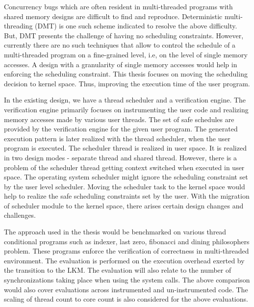 Concurrency bugs which are often resident in multi-threaded programs with shared memory designs are difficult to find and reproduce. 
Deterministic multi-threading (DMT) is one such scheme indicated to resolve the above difficulty. 
But, DMT presents the challenge of having no scheduling constraints.  
However, currently there are no such techniques that allow to control the schedule of a multi-threaded program on a fine-grained level, i.e, on the level of single memory accesses. 
A design with a granularity of single memory accesses would help in enforcing the scheduling constraint. 
This thesis focuses on moving the scheduling decision to kernel space. 
Thus, improving the execution time of the user program.


In the existing design, we have a thread scheduler and a verification engine.  
The verification engine primarily focuses on instrumenting the user code and realizing memory accesses made by various user threads. 
The set of safe schedules are provided by the verification engine for the given user program. 
The generated execution pattern is later realized with the thread scheduler, when the user program is executed. 
The scheduler thread is realized in user space. 
It is realized in two design modes - separate thread and shared thread. 
However, there is a problem of the scheduler thread getting context switched when executed in user space. 
The operating system scheduler might ignore the scheduling constraint set by the user level scheduler. 
Moving the scheduler task to the kernel space would help to realize the safe scheduling constraints set by the user. 
With the migration of scheduler module to the kernel space, there arises certain design changes and challenges. 

The approach used in the thesis would be benchmarked on various thread conditional programs such as indexer, last zero, fibonacci and dining philosophers problem. 
These programs enforce the verification of correctness in multi-threaded environment. 
The evaluation is performed on the execution overhead exerted by the transition to the LKM. 
The evaluation will also relate to the number of synchronizations taking place when using the system calls. 
The above comparison would also cover evaluations across instrumented and un-instrumented code. 
The scaling of thread count to core count is also considered for the above evaluations.